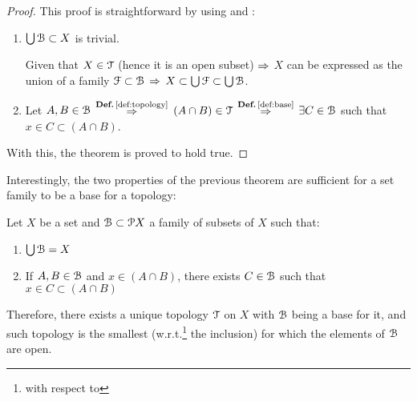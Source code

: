 \begin{proof}
	This proof is straightforward by using  and :
	\begin{enumerate}
		\item \noindent{$\boxed{\subseteq}$}  $\bigcup\EuScript{B} \subset X$ is trivial.

		\noindent{$\boxed{\supseteq}$} Given that $X\in \EuScript{T}$ (hence it is an open
		subset) $\Rightarrow$ $X$ can be expressed as the union of a family $\EuScript{F}\subset \EuScript{B}$
		$\Rightarrow$ $X \subset \bigcup \EuScript{F}\subset \bigcup \EuScript{B}$.

		\item Let $A, B\in \EuScript{B}$ $\overset{\text{\defref{def:topology}}}{\Then}$
		$(A\cap B)\in \EuScript{T}$ $\overset{\text{\defref{def:base}}}{\Then}$
		$\exists C\in \EuScript{B}$ such that $x\in C\subset(A\cap B)$.
	\end{enumerate}
	With this, the theorem is proved to hold true.
\end{proof}

Interestingly, the two properties of the previous theorem are sufficient for a set
family to be a base for a topology:

\begin{theorem}
	Let $X$ be a set and $\EuScript{B}\subset \EuScript{P} X$ a family of subsets of $X$ such that:
	\begin{enumerate}
		\item $\bigcup \EuScript{B} = X$
		\item If $A, B\in \EuScript{B}$ and $x\in (A\cap B)$, there exists $C\in \EuScript{B}$ such that
		$x\in C\subset (A\cap B)$
	\end{enumerate}
	Therefore, there exists a unique topology $\EuScript{T}$ on $X$ with $\EuScript{B}$ being a base for it,
	and such topology is the smallest (w.r.t.\footnote{with respect to} the inclusion)
	for which the elements of $\EuScript{B}$ are open.
	\label{th:1-3}
\end{theorem}

